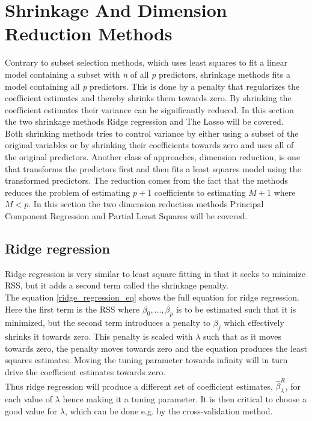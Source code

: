 \graphicspath{{Chapters/Indledning/}}

\chapter{Shrinkage And Dimension Reduction Methods }
Contrary to subset selection methods, which uses least squares to fit a linear model containing a subset with \emph{n} of all \emph{p} predictors, shrinkage methods fits a model containing all \emph{p} predictors. This is done by a penalty that regularizes the coefficient estimates and thereby shrinks them towards zero. By shrinking the coefficient estimates their variance can be significantly reduced. In this section the two shrinkage methods Ridge regression and The Lasso will be covered.\\
Both shrinking methods tries to control variance by either using a subset of the original variables or by shrinking their coefficients towards zero and uses all of the original predictors. Another class of approaches, dimension reduction, is one that transforms the predictors first and then fits a least squares model using the transformed predictors. The reduction comes from the fact that the methods reduces the problem of estimating \(p+1\) coefficients to estimating \(M+1\) where \(M < p\). In this section the two dimension reduction methods Principal Component Regression and Partial Least Squares will be covered.


\section{Ridge regression}
Ridge regression is very similar to least square fitting in that it seeks to minimize RSS, but it adds a second term called the shrinkage penalty.\\ 
The equation \ref{ridge_regression_eq} shows the full equation for ridge regression. Here the first term is the RSS where \(\beta_0,...,\beta_p\) is to be estimated such that it is minimized, but the second term introduces a penalty to \(\beta_j\) which effectively shrinks it towards zero. This penalty is scaled with \(\lambda\) such that as it moves towards zero, the penalty moves towards zero and the equation produces the least squares estimates. Moving the tuning parameter towards infinity will in turn drive the coefficient estimates towards zero.\\ 
Thus ridge regression will produce a different set of coefficient estimates, \(\hat{\beta}_{\lambda}^{R}\), for each value of \(\lambda\) hence making it a tuning parameter. It is then critical to choose a good value for \(\lambda\), which can be done e.g. by the cross-validation method.

